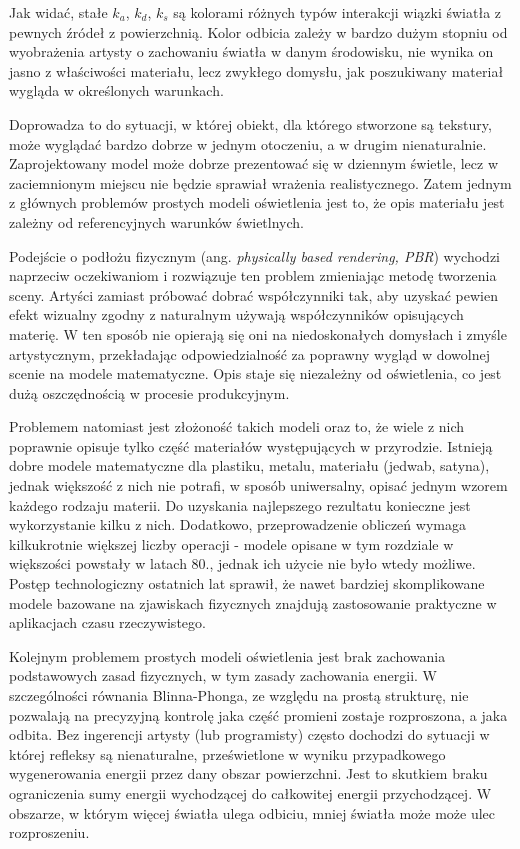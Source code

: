\documentclass[../main.tex]{subfiles}
\begin{document}
Jak widać, stałe $k_a$, $k_d$, $k_s$ są kolorami różnych typów interakcji wiązki światła z pewnych źródeł z powierzchnią. Kolor odbicia zależy w bardzo dużym stopniu od wyobrażenia artysty o zachowaniu światła w danym środowisku, nie wynika on jasno z właściwości materiału, lecz zwykłego domysłu, jak poszukiwany materiał wygląda w określonych warunkach.

Doprowadza to do sytuacji, w której obiekt, dla którego stworzone są tekstury, może wyglądać bardzo dobrze w jednym otoczeniu, a w drugim nienaturalnie. Zaprojektowany model może dobrze prezentować się w dziennym świetle, lecz w zaciemnionym miejscu nie będzie sprawiał wrażenia realistycznego. Zatem jednym z głównych problemów prostych modeli oświetlenia jest to, że opis materiału jest zależny od referencyjnych warunków świetlnych.

Podejście o podłożu fizycznym (ang. \textit{physically based rendering, PBR}) wychodzi naprzeciw oczekiwaniom i rozwiązuje ten problem
zmieniając metodę tworzenia sceny. Artyści zamiast próbować dobrać
współczynniki tak, aby uzyskać pewien efekt wizualny zgodny z naturalnym
używają współczynników opisujących materię. W ten sposób nie opierają się oni
na niedoskonałych domysłach i zmyśle artystycznym, przekładając
odpowiedzialność za poprawny wygląd w dowolnej scenie na modele matematyczne.
Opis staje się niezależny od oświetlenia, co jest dużą oszczędnością w procesie
produkcyjnym.

Problemem natomiast jest złożoność takich modeli oraz to, że wiele z nich poprawnie opisuje tylko część materiałów występujących w przyrodzie. Istnieją dobre modele matematyczne dla plastiku, metalu, materiału (jedwab, satyna), jednak większość z nich nie potrafi, w sposób uniwersalny, opisać jednym wzorem każdego rodzaju materii. Do uzyskania najlepszego rezultatu konieczne jest wykorzystanie kilku z nich.
Dodatkowo, przeprowadzenie obliczeń wymaga kilkukrotnie
większej liczby operacji - modele opisane w tym rozdziale w większości powstały
w latach 80., jednak ich użycie nie było wtedy możliwe. Postęp technologiczny 
ostatnich lat sprawił, że nawet bardziej skomplikowane modele bazowane na zjawiskach fizycznych znajdują zastosowanie praktyczne w aplikacjach czasu rzeczywistego.

Kolejnym problemem prostych modeli oświetlenia jest brak zachowania
podstawowych zasad fizycznych, w tym zasady zachowania energii. W szczególności
równania Blinna-Phonga, ze względu na prostą strukturę, nie pozwalają na
precyzyjną kontrolę jaka część promieni zostaje rozproszona, a jaka odbita. Bez
ingerencji artysty (lub programisty) często dochodzi do sytuacji w której
refleksy są nienaturalne, prześwietlone w wyniku przypadkowego wygenerowania 
energii przez dany obszar powierzchni. Jest to skutkiem braku ograniczenia 
sumy energii wychodzącej do całkowitej energii przychodzącej. W obszarze, w którym więcej światła ulega odbiciu, mniej światła może może ulec rozproszeniu.
\end{document}
